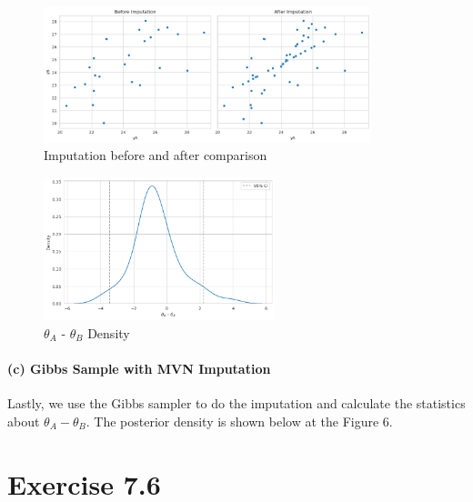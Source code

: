\documentclass[11pt, letterpaper]{article}
\begin{document}
\begin{figure}[!h]
  \centering
  \includegraphics[width=0.85\textwidth]{2.a.png}
  \captionsetup{justification=centering}
  \caption{Imputation before and after comparison}
\end{figure}
\begin{figure}[!h]
  \centering
  \includegraphics[width=0.6\textwidth]{2.b.png}
  \captionsetup{justification=centering}
  \caption{$\theta_A$ - $\theta_B$ Density}
\end{figure}

\paragraph{(c) Gibbs Sample with MVN Imputation}
Lastly, we use the Gibbs sampler to do the imputation and calculate the statistics about $\theta_A - \theta_B$. The posterior density is shown below at the Figure 6.

\section{Exercise 7.6}
\end{document}
